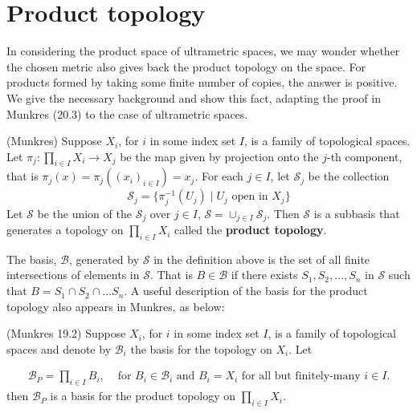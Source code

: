 \section*{Product topology}
In considering the product space of ultrametric spaces, we may wonder whether the chosen metric also gives back the product topology on the space.  For products formed by taking some finite number of copies, the answer is positive. We give the necessary background and show this fact, adapting the proof in Munkres (20.3) to the case of ultrametric spaces. 

\begin{definition-proposition*} (Munkres)
Suppose $X_i$, for $i$ in some index set $I$, is a family of topological spaces.  Let $\pi_j: \prod_{i \in I} X_i \rightarrow X_j$ be the map given by projection onto the $j$-th component, that is $\pi_j (x) = \pi_j ((x_i)_{i \in I}) = x_j$. For each $j \in I$, let $\mathcal{S}_j$ be the collection \[\mathcal{S}_j = \{\pi^{-1}_j (U_j)\mid U_j \text{ open in } X_j\}\] Let $\mathcal{S}$ be the union of the $\mathcal{S}_j$ over $j \in I$, $\mathcal{S}= \cup_{j \in I} \mathcal{S}_j$. Then $\mathcal{S}$ is a subbasis that generates a topology on  $\prod_{i \in I} X_i$ called the \textbf{product topology}.\\

\end{definition-proposition*}


 The basis, $\mathcal{B}$, generated by $\mathcal{S}$ in the definition above is the set of all finite intersections of elements in $\mathcal{S}$. That is $B \in \mathcal{B}$ if there exists $S_1, S_2, \ldots, S_n$ in $\mathcal{S}$ such that $B = S_1 \cap S_2 \cap \ldots S_n$.  A useful description of the basis for the product topology also appears in Munkres, as below:

\begin{proposition*} (Munkres 19.2)
Suppose $X_i$, for $i$ in some index set $I$, is a family of topological spaces and denote by $\mathcal{B}_i$ the basis for the topology on $X_i$. Let 

\begin{align*}
\mathcal{B}_P = \prod_{i \in I} B_i, & \text{ for }  B_i \in \mathcal{B}_i \text { and } B_i = X_i \text{ for all but finitely-many } i \in I. 
\end{align*}
then $\mathcal{B}_P$ is a basis for the product topology on $\prod_{i \in I} X_i$.\\

\end{proposition*}

